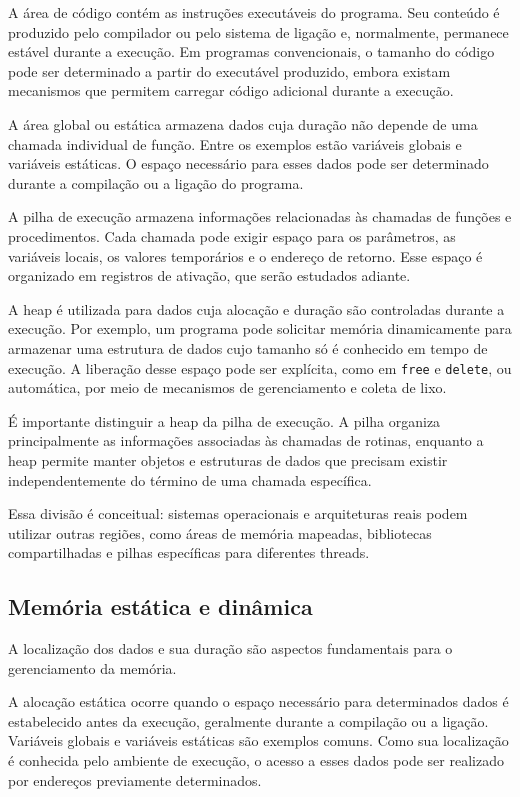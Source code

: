 \documentclass[
  brazilian,
  letterpaper,
]{book}
\theoremstyle{plain}
\theoremstyle{definition}
\theoremstyle{remark}
\begin{document}
A área de código contém as instruções executáveis do programa. Seu
conteúdo é produzido pelo compilador ou pelo sistema de ligação e,
normalmente, permanece estável durante a execução. Em programas
convencionais, o tamanho do código pode ser determinado a partir do
executável produzido, embora existam mecanismos que permitem carregar
código adicional durante a execução.

A área global ou estática armazena dados cuja duração não depende de uma
chamada individual de função. Entre os exemplos estão variáveis globais
e variáveis estáticas. O espaço necessário para esses dados pode ser
determinado durante a compilação ou a ligação do programa.

A pilha de execução armazena informações relacionadas às chamadas de
funções e procedimentos. Cada chamada pode exigir espaço para os
parâmetros, as variáveis locais, os valores temporários e o endereço de
retorno. Esse espaço é organizado em registros de ativação, que serão
estudados adiante.

A heap é utilizada para dados cuja alocação e duração são controladas
durante a execução. Por exemplo, um programa pode solicitar memória
dinamicamente para armazenar uma estrutura de dados cujo tamanho só é
conhecido em tempo de execução. A liberação desse espaço pode ser
explícita, como em \texttt{free} e \texttt{delete}, ou automática, por
meio de mecanismos de gerenciamento e coleta de lixo.

É importante distinguir a heap da pilha de execução. A pilha organiza
principalmente as informações associadas às chamadas de rotinas,
enquanto a heap permite manter objetos e estruturas de dados que
precisam existir independentemente do término de uma chamada específica.

Essa divisão é conceitual: sistemas operacionais e arquiteturas reais
podem utilizar outras regiões, como áreas de memória mapeadas,
bibliotecas compartilhadas e pilhas específicas para diferentes threads.

\subsection{Memória estática e
dinâmica}\label{memuxf3ria-estuxe1tica-e-dinuxe2mica}

A localização dos dados e sua duração são aspectos fundamentais para o
gerenciamento da memória.

A alocação estática ocorre quando o espaço necessário para determinados
dados é estabelecido antes da execução, geralmente durante a compilação
ou a ligação. Variáveis globais e variáveis estáticas são exemplos
comuns. Como sua localização é conhecida pelo ambiente de execução, o
acesso a esses dados pode ser realizado por endereços previamente
determinados.
\end{document}
